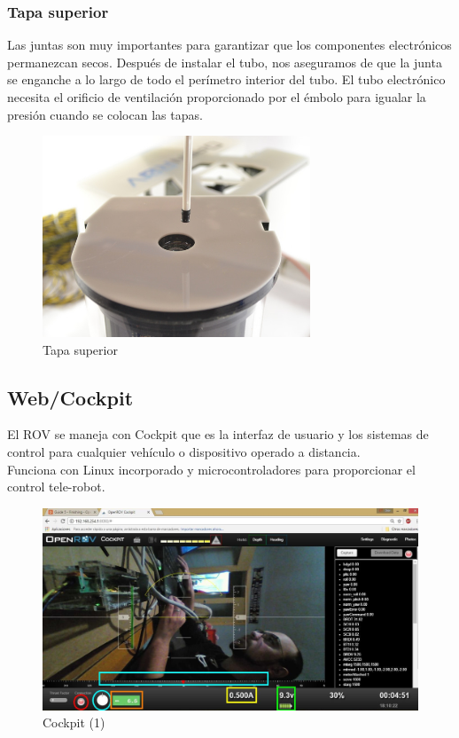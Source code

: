 \subsubsection{Tapa superior}
\label{subsubsec:tapa}
Las juntas son muy importantes para garantizar que los componentes electrónicos permanezcan secos.
Después de instalar el tubo, nos aseguramos  de que la junta se enganche a lo largo de todo el perímetro interior del tubo.
El tubo electrónico necesita el orificio de ventilación proporcionado por el émbolo para igualar la presión cuando se colocan las tapas.
\begin{figure} [hbtp]
\begin{center}
  \includegraphics[width=8cm]{img/cap3/3_4/tapa_superior}
\end{center}
\caption{Tapa superior}
\label{fig:tapa_sup}
\end{figure}  

\newpage
\subsection{Web/Cockpit}
\label{subsec:cockpit}
El ROV se maneja con Cockpit que es la interfaz de usuario y los sistemas de control para cualquier vehículo o dispositivo operado a distancia.
\\Funciona con Linux incorporado y microcontroladores para proporcionar el control tele-robot.

\begin{figure} [hbtp]
\begin{center}
  \includegraphics[width=15cm]{img/cap3/3_5/cockpit1}
\end{center}
\caption{Cockpit (1)}
\label{fig:cockpit1}
\end{figure}


